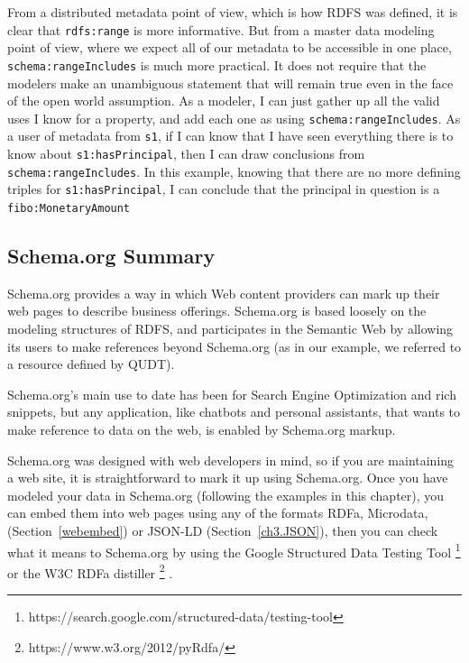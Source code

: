 From a distributed metadata point of view, which is how RDFS was defined, it is clear that \texttt{rdfs:range} is more informative.
But from a master data modeling point of view, where we expect all of our metadata to be accessible in one place, \texttt{schema:rangeIncludes} 
is much more practical.  It does not require that the modelers make an unambiguous statement that will remain true even 
in the face of the open world assumption.   As a modeler, I can just gather up all the valid uses I know for a property,
and add each one as using \texttt{schema:rangeIncludes}.  As a user of metadata from \texttt{s1}, if I can know that I have seen everything 
there is to know about \texttt{s1:hasPrincipal}, then I can draw conclusions from \texttt{schema:rangeIncludes}.  In this example,
knowing that there are no more defining triples for \texttt{s1:hasPrincipal},  I can conclude that the principal 
in question is a \texttt{fibo:MonetaryAmount}

\subsection{Schema.org Summary}

Schema.org provides a way in which Web content
providers can mark up their web pages to describe business offerings.
Schema.org is based loosely on the modeling structures of RDFS, and participates
in the Semantic Web by allowing its users to make references beyond Schema.org 
(as in our example, we referred to a resource defined by QUDT). 

Schema.org's main use to date has been for Search Engine Optimization and 
rich snippets, but any application, like chatbots and personal assistants, that 
wants to make reference to data on the web, is enabled by Schema.org markup. 

Schema.org was designed with web developers in mind, so if you are maintaining 
a web site, it is straightforward to mark it up using Schema.org. 
Once you have modeled your data in Schema.org (following the examples
in this chapter), you can embed them into web pages
using any of the formats RDFa, Microdata, (Section~\ref{webembed}) or 
JSON-LD (Section~\ref{ch3.JSON}), then you can check what it means to Schema.org
by using the Google Structured Data Testing Tool \footnote{https://search.google.com/structured-data/testing-tool} or the W3C RDFa distiller \footnote{https://www.w3.org/2012/pyRdfa/} .






